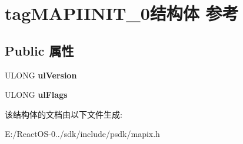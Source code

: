 \hypertarget{structtag_m_a_p_i_i_n_i_t__0}{}\section{tag\+M\+A\+P\+I\+I\+N\+I\+T\+\_\+0结构体 参考}
\label{structtag_m_a_p_i_i_n_i_t__0}
\subsection*{Public 属性}
\begin{DoxyCompactItemize}
\item 
\mbox{\label{structtag_m_a_p_i_i_n_i_t__0_aa15bc0e27eb8a0e22952085794245015}} 
U\+L\+O\+NG {\bfseries ul\+Version}
\item 
\mbox{\label{structtag_m_a_p_i_i_n_i_t__0_abb3fa5e16a19f18e8af323c8651bec7d}} 
U\+L\+O\+NG {\bfseries ul\+Flags}
\end{DoxyCompactItemize}


该结构体的文档由以下文件生成\+:\begin{DoxyCompactItemize}
\item 
E\+:/\+React\+O\+S-\/0../sdk/include/psdk/mapix.\+h\end{DoxyCompactItemize}
